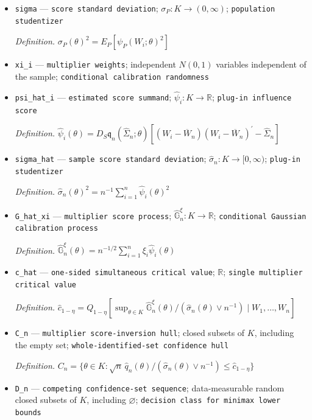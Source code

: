 \documentclass{article}
\begin{document}
\begin{itemize}
  \item \texttt{sigma} --- \texttt{score standard deviation}; \(\sigma_P:K\to(0,\infty)\); \texttt{population studentizer}
  \par\smallskip\noindent\emph{Definition.} \(\sigma_P(\theta)^2=E_P[\psi_P(W_i;\theta)^2]\)
  \item \texttt{xi\_\allowbreak{}i} --- \texttt{multiplier weights}; independent \(N(0,1)\) variables independent of the sample; \texttt{conditional calibration randomness}
  \item \texttt{psi\_\allowbreak{}hat\_\allowbreak{}i} --- \texttt{estimated score summand}; \(\widehat\psi_i:K\to\mathbb R\); \texttt{plug-\allowbreak{}in influence score}
  \par\smallskip\noindent\emph{Definition.} \(\widehat\psi_i(\theta)=D_S\mathfrak q_n(\widehat\Sigma_n;\theta)[(W_i-\overline W_n)(W_i-\overline W_n)^{\prime}-\widehat\Sigma_n]\)
  \item \texttt{sigma\_\allowbreak{}hat} --- \texttt{sample score standard deviation}; \(\widehat\sigma_n:K\to[0,\infty)\); \texttt{plug-\allowbreak{}in studentizer}
  \par\smallskip\noindent\emph{Definition.} \(\widehat\sigma_n(\theta)^2=n^{-1}\sum_{i=1}^n\widehat\psi_i(\theta)^2\)
  \item \texttt{G\_\allowbreak{}hat\_\allowbreak{}xi} --- \texttt{multiplier score process}; \(\widehat{\mathbb G}_n^{\xi}:K\to\mathbb R\); \texttt{conditional Gaussian calibration process}
  \par\smallskip\noindent\emph{Definition.} \(\widehat{\mathbb G}_n^{\xi}(\theta)=n^{-1/2}\sum_{i=1}^n\xi_i\widehat\psi_i(\theta)\)
  \item \texttt{c\_\allowbreak{}hat} --- \texttt{one-\allowbreak{}sided simultaneous critical value}; \(\mathbb R\); \texttt{single multiplier critical value}
  \par\smallskip\noindent\emph{Definition.} \(\widehat c_{1-\eta}=Q_{1-\eta}[\sup_{\theta\in K}\widehat{\mathbb G}_n^{\xi}(\theta)/(\widehat\sigma_n(\theta)\vee n^{-1})\mid W_1,\ldots,W_n]\)
  \item \texttt{C\_\allowbreak{}n} --- \texttt{multiplier score-\allowbreak{}inversion hull}; closed subsets of \(K\), including the empty set; \texttt{whole-\allowbreak{}identified-\allowbreak{}set confidence hull}
  \par\smallskip\noindent\emph{Definition.} \(C_n=\{\theta\in K:\sqrt n\,\widehat q_n(\theta)/(\widehat\sigma_n(\theta)\vee n^{-1})\leq\widehat c_{1-\eta}\}\)
  \item \texttt{D\_\allowbreak{}n} --- \texttt{competing confidence-\allowbreak{}set sequence}; data-measurable random closed subsets of \(K\), including \(\varnothing\); \texttt{decision class for minimax lower bounds}

\end{itemize}
\end{document}
